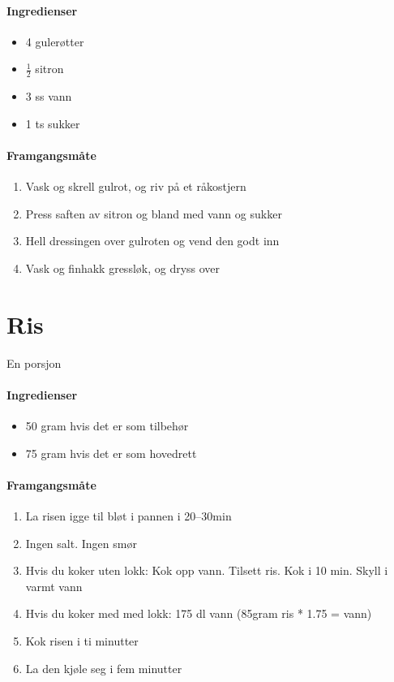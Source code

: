 \documentclass[12pt,a4paper]{book}
\begin{document}
\paragraph{Ingredienser}
\begin{itemize}[noitemsep]
	\item 4 gulerøtter
	\item $\frac{1}{2}$  sitron
	\item 3 ss vann
	\item 1 ts sukker
\end{itemize}

\paragraph{Framgangsmåte}
\begin{enumerate}[noitemsep]
	\item Vask og skrell gulrot, og riv på et råkostjern
	\item Press saften av sitron og bland med vann og sukker
	\item Hell dressingen over gulroten og vend den godt inn
	\item Vask og finhakk gressløk, og dryss over
\end{enumerate}
\clearpage{}
\clearpage{}\section{﻿Ris}
\label{ris}
En porsjon

\paragraph{Ingredienser}
\begin{itemize}[noitemsep]
	\item 50 gram hvis det er som tilbehør
	\item 75 gram hvis det er som hovedrett
\end{itemize}

\paragraph{Framgangsmåte}
\begin{enumerate}[noitemsep]
	\item La risen igge til bløt i pannen i 20--30min
	\item Ingen salt. Ingen smør
	\item Hvis du koker uten lokk: Kok opp vann. Tilsett ris. Kok i 10 min. Skyll i varmt vann
	\item Hvis du koker med med lokk: 175 dl vann (85gram ris * 1.75 = vann)
	\item Kok risen i ti minutter
	\item La den kjøle seg i fem minutter
\end{enumerate}
\end{document}
